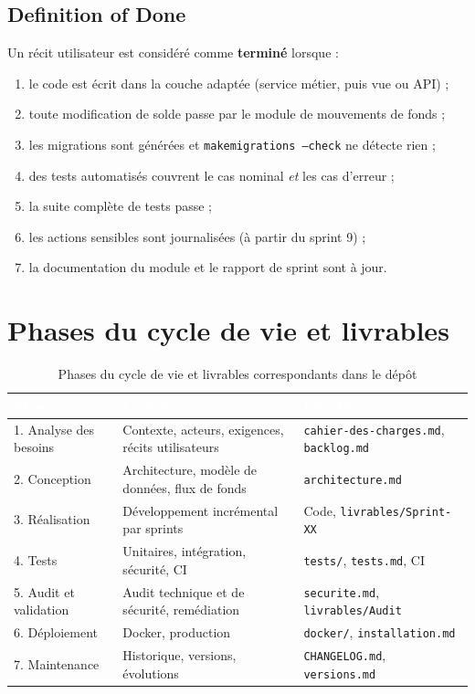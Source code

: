 \documentclass[11pt,a4paper]{report}
\newcommand{\entete}{\rowcolor{primaire}}
\newcommand{\tete}[1]{\textcolor{white}{\textbf{#1}}}
\newcommand{\code}[1]{\texttt{\small #1}}
\begin{document}
\subsection*{Definition of Done}

Un récit utilisateur est considéré comme \textbf{terminé} lorsque :
\begin{enumerate}
  \item le code est écrit dans la couche adaptée (service métier, puis vue ou API) ;
  \item toute modification de solde passe par le module de mouvements de fonds ;
  \item les migrations sont générées et \code{makemigrations --check} ne détecte rien ;
  \item des tests automatisés couvrent le cas nominal \emph{et} les cas d'erreur ;
  \item la suite complète de tests passe ;
  \item les actions sensibles sont journalisées (à partir du sprint 9) ;
  \item la documentation du module et le rapport de sprint sont à jour.
\end{enumerate}

\section{Phases du cycle de vie et livrables}

\begin{table}[H]
\centering
\caption{Phases du cycle de vie et livrables correspondants dans le dépôt}
\begin{tabularx}{\linewidth}{@{}p{3.4cm}Yp{4.6cm}@{}}
\toprule
\entete \tete{Phase} & \tete{Contenu} & \tete{Livrables} \\
. Analyse des besoins & Contexte, acteurs, exigences, récits utilisateurs & \code{cahier-des-charges.md}, \code{backlog.md} \\
2. Conception & Architecture, modèle de données, flux de fonds & \code{architecture.md} \\
3. Réalisation & Développement incrémental par sprints & Code, \code{livrables/Sprint-XX} \\
4. Tests & Unitaires, intégration, sécurité, CI & \code{tests/}, \code{tests.md}, CI \\
5. Audit et validation & Audit technique et de sécurité, remédiation & \code{securite.md}, \code{livrables/Audit} \\
6. Déploiement & Docker, production & \code{docker/}, \code{installation.md} \\
7. Maintenance & Historique, versions, évolutions & \code{CHANGELOG.md}, \code{versions.md} \\
\bottomrule
\end{tabularx}
\end{table}
\end{document}
